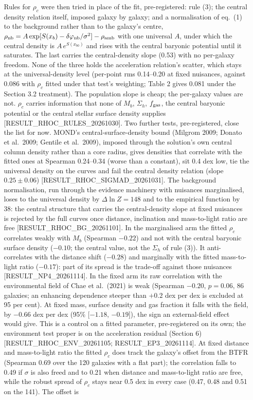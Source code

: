 \documentclass[
  10pt,
]{article}
\begin{document}
Rules for $\rho_c$ were then tried in place of the fit, pre-registered: rule (3); the central density relation itself, imposed galaxy by galaxy; and a normalisation of eq.~(1) to the background rather than to the galaxy's centre, $\rho_{\rm nb}=A\exp[S(x_b)-\delta\varphi_{\rm nb}/\sigma^2]-\rho_{\rm amb}$ with one universal $A$, under which the central density is $A\,e^{S(x_{b0})}$ and rises with the central baryonic potential until it saturates. The last carries the central-density slope (0.53) with no per-galaxy freedom. None of the three holds the acceleration relation's scatter, which stays at the universal-density level (per-point rms 0.14--0.20 at fixed nuisances, against 0.086 with $\rho_c$ fitted under that test's weighting; Table 2 gives 0.081 under the Section 3.2 treatment). The population slope is cheap; the per-galaxy values are not. $\rho_c$ carries information that none of $M_b$, $\Sigma_h$, $f_{\rm gas}$, the central baryonic potential or the central stellar surface density supplies {[}RESULT\_RHOC\_RULES\_20261030{]}. Two further tests, pre-registered, close the list for now. MOND's central-surface-density bound (Milgrom 2009; Donato et al.~2009; Gentile et al.~2009), imposed through the solution's own central column density rather than a core radius, gives densities that correlate with the fitted ones at Spearman 0.24--0.34 (worse than a constant), sit 0.4 dex low, tie the universal density on the curves and fail the central density relation (slope $0.25\pm0.06$) {[}RESULT\_RHOC\_SIGMAD\_20261031{]}. The background normalisation, run through the evidence machinery with nuisances marginalised, loses to the universal density by $\Delta\ln Z=148$ and to the empirical function by 38: the central structure that carries the central-density slope at fixed nuisances is rejected by the full curves once distance, inclination and mass-to-light ratio are free {[}RESULT\_RHOC\_BG\_20261101{]}. In the marginalised arm the fitted $\rho_c$ correlates weakly with $M_b$ (Spearman $-0.22$) and not with the central baryonic surface density ($-0.10$; the central value, not the $\Sigma_h$ of rule (3)). It anti-correlates with the distance shift ($-0.28$) and marginally with the fitted mass-to-light ratio ($-0.17$): part of its spread is the trade-off against those nuisances {[}RESULT\_NP4\_20261114{]}. In the fixed arm its raw correlation with the environmental field of Chae et al.~(2021) is weak (Spearman $-0.20$, $p=0.06$, 86 galaxies; an enhancing dependence steeper than $+0.2$ dex per dex is excluded at 95 per cent). At fixed mass, surface density and gas fraction it falls with the field, by $-0.66$ dex per dex (95\% {[}$-1.18$, $-0.19${]}), the sign an external-field effect would give. This is a control on a fitted parameter, pre-registered on its own; the environment test proper is on the acceleration residual (Section 6) {[}RESULT\_RHOC\_ENV\_20261105; RESULT\_EP3\_20261114{]}. At fixed distance and mass-to-light ratio the fitted $\rho_c$ does track the galaxy's offset from the BTFR (Spearman 0.69 over the 120 galaxies with a flat part); the correlation falls to 0.49 if $\sigma$ is also freed and to 0.21 when distance and mass-to-light ratio are free, while the robust spread of $\rho_c$ stays near 0.5 dex in every case (0.47, 0.48 and 0.51 on the 141). The offset is 
\end{document}
